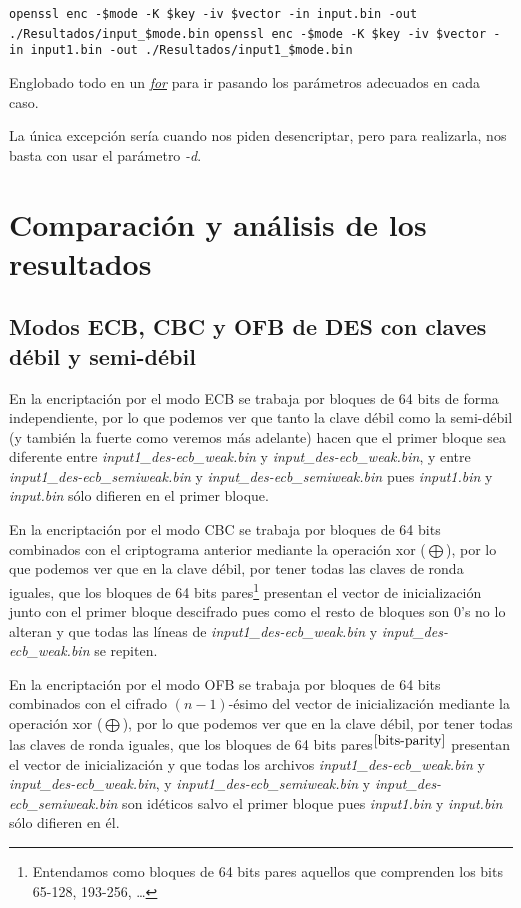 \documentclass[a4paper, 11pt]{article}
\begin{document}
		\begin{small}
			\verb|openssl enc -$mode -K $key -iv $vector -in input.bin -out ./Resultados/input_$mode.bin|
			\verb|openssl enc -$mode -K $key -iv $vector -in input1.bin -out ./Resultados/input1_$mode.bin|
		\end{small}
		
		Englobado todo en un \href{http://manpages.ubuntu.com/manpages/zesty/en/man3/for.3tcl.html}{\textit{for}} para ir
		pasando los parámetros adecuados en cada caso.
		
		La única excepción sería cuando nos piden desencriptar, pero para realizarla, nos basta con usar el parámetro \textit{-d}.
	
\section{Comparación y análisis de los resultados}
	\subsection{Modos ECB, CBC y OFB de DES con claves débil y semi-débil}
		En la encriptación por el modo ECB se trabaja por bloques de 64 bits de forma independiente, por lo que podemos ver
		que tanto la clave débil como la semi-débil (y también la fuerte como veremos más adelante) hacen que el primer
		bloque sea diferente entre \textit{input1\_des-ecb\_weak.bin} y \textit{input\_des-ecb\_weak.bin}, y entre
		\textit{input1\_des-ecb\_semiweak.bin} y \textit{input\_des-ecb\_semiweak.bin} pues \textit{input1.bin} y
		\textit{input.bin} sólo difieren en el primer bloque.
		
		En la encriptación por el modo CBC se trabaja por bloques de 64 bits combinados con el criptograma anterior mediante
		la operación xor ($\bigoplus$), por lo que podemos ver que en la clave débil, por tener todas las claves de ronda
		iguales, que los bloques de 64 bits pares\footnote{Entendamos como bloques de 64 bits pares aquellos que comprenden
						los bits 65-128, 193-256, \dots \label{bits-parity}} presentan el vector de inicialización junto con el primer bloque descifrado pues
		como el resto de bloques son 0's no lo alteran y que todas las líneas de \textit{input1\_des-ecb\_weak.bin} y
		\textit{input\_des-ecb\_weak.bin} se repiten.

		En la encriptación por el modo OFB se trabaja por bloques de 64 bits combinados con el cifrado $(n-1)$-ésimo del vector
		de inicialización mediante la operación xor ($\bigoplus$), por lo que podemos ver que en la clave débil, por tener
		todas las claves de ronda iguales, que los bloques de 64 bits pares$^{\ref{bits-parity}}$ presentan el vector de
		inicialización y que todas los archivos \textit{input1\_des-ecb\_weak.bin} y \textit{input\_des-ecb\_weak.bin}, y 
		\textit{input1\_des-ecb\_semiweak.bin} y \textit{input\_des-ecb\_semiweak.bin} son idéticos salvo el primer bloque
		pues \textit{input1.bin} y \textit{input.bin} sólo difieren en él.
				
\end{document}
